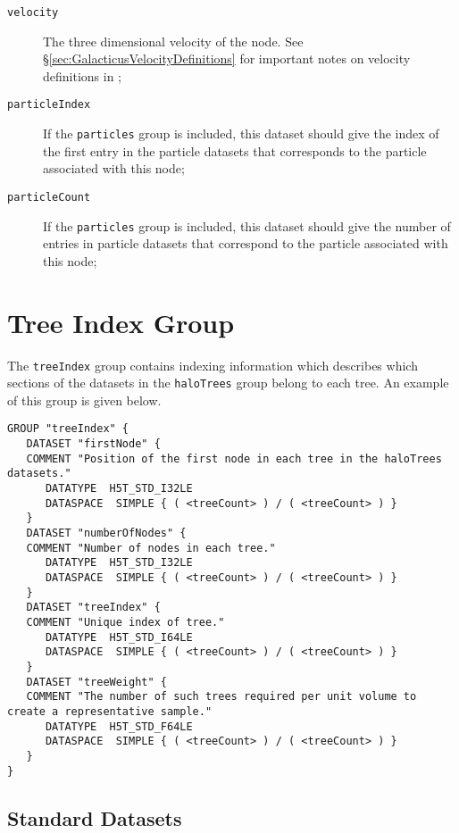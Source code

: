 \begin{description}
 \item [{\tt velocity}] The three dimensional velocity of the node. See \S\ref{sec:GalacticusVelocityDefinitions} for important notes on velocity definitions in \glc;
 \item [{\tt particleIndex}] If the {\tt particles} group is included, this dataset should give the index of the first entry in the particle datasets that corresponds to the particle associated with this node;
 \item [{\tt particleCount}] If the {\tt particles} group is included, this dataset should give the number of entries in particle datasets that correspond to the particle associated with this node;
\end{description}

\section{Tree Index Group}

The {\tt treeIndex} group contains indexing information which describes which sections of the datasets in the {\tt haloTrees} group belong to each tree. An example of this group is given below.

\begin{verbatim}
GROUP "treeIndex" {
   DATASET "firstNode" {
   COMMENT "Position of the first node in each tree in the haloTrees datasets."
      DATATYPE  H5T_STD_I32LE
      DATASPACE  SIMPLE { ( <treeCount> ) / ( <treeCount> ) }
   }
   DATASET "numberOfNodes" {
   COMMENT "Number of nodes in each tree."
      DATATYPE  H5T_STD_I32LE
      DATASPACE  SIMPLE { ( <treeCount> ) / ( <treeCount> ) }
   }
   DATASET "treeIndex" {
   COMMENT "Unique index of tree."
      DATATYPE  H5T_STD_I64LE
      DATASPACE  SIMPLE { ( <treeCount> ) / ( <treeCount> ) }
   }
   DATASET "treeWeight" {
   COMMENT "The number of such trees required per unit volume to create a representative sample."
      DATATYPE  H5T_STD_F64LE
      DATASPACE  SIMPLE { ( <treeCount> ) / ( <treeCount> ) }
   }
}
\end{verbatim}

\subsection{Standard Datasets}

